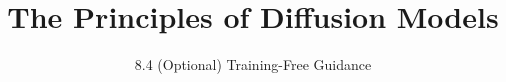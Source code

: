﻿%

\graphicspath{{../images/}}
\title{The Principles of Diffusion Models}
\subtitle{8.4 (Optional) Training-Free Guidance}


\begin{frame}
    \titlepage
\end{frame}



